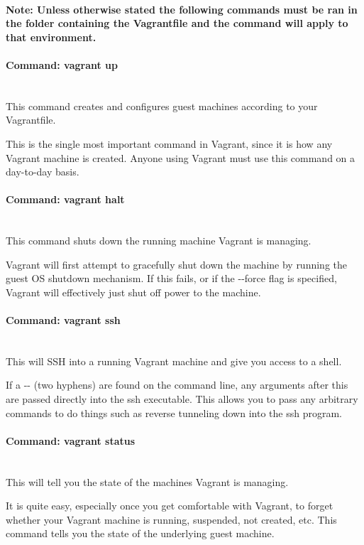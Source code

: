 \paragraph{Note: Unless otherwise stated the following commands must be ran in the folder containing the Vagrantfile and the command will apply to that environment.}

\paragraph{Command: {\color{red} vagrant up}} ~\\
This command creates and configures guest machines according to your Vagrantfile.

This is the single most important command in Vagrant, since it is how any Vagrant machine is created. Anyone using Vagrant must use this command on a day-to-day basis.

\paragraph{Command: {\color{red} vagrant halt}} ~\\
This command shuts down the running machine Vagrant is managing.

Vagrant will first attempt to gracefully shut down the machine by running the guest OS shutdown mechanism. If this fails, or if the -{}-force flag is specified, Vagrant will effectively just shut off power to the machine.

\paragraph{Command: {\color{red} vagrant ssh}} ~\\
This will SSH into a running Vagrant machine and give you access to a shell.

If a -{}- (two hyphens) are found on the command line, any arguments after this are passed directly into the ssh executable. This allows you to pass any arbitrary commands to do things such as reverse tunneling down into the ssh program.

\paragraph{Command: {\color{red} vagrant status}} ~\\
This will tell you the state of the machines Vagrant is managing.

It is quite easy, especially once you get comfortable with Vagrant, to forget whether your Vagrant machine is running, suspended, not created, etc. This command tells you the state of the underlying guest machine.

